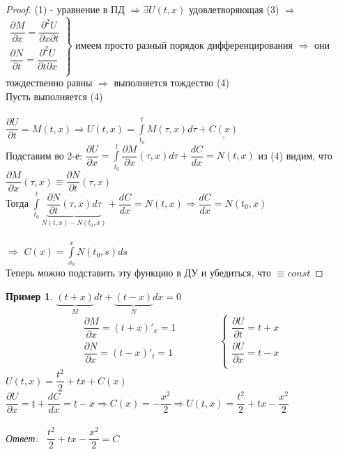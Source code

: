 \documentclass[12pt,a4paper,hidelinks]{article}            %
\newcommand{\pd}[2]{\dfrac{\partial #1}{\partial #2}}
\newcommand{\dd}[2]{\dfrac{d #1}{d #2}}
\newtheorem*{mex}{Пример}
\begin{document}
\begin{proof}
    (1) - уравнение в ПД $\Longrightarrow \exists U(t,x)$ удовлетворяющая (3) $\Longrightarrow$ \\
    $ \left.
    \begin{aligned}
    \pd{M}{x}=\dfrac{\partial^2U}{\partial x \partial t}\\
    \pd{N}{t}=\dfrac{\partial^2U}{\partial t \partial x}\\
    \end{aligned}
    \right\} $
    имеем просто разный порядок дифференцирования $\Longrightarrow$ они тождественно равны $\Longrightarrow$ выполняется тождество (4) \\
    \boxed{\Longleftarrow}
    Пусть выполняется (4) \\\\
    $\pd{U}{t}=M(t,x)\Longrightarrow U(t,x)=\int\limits^{t}_{t_0}M(\tau ,x)d\tau+\underline{\underline{C(x)}}$ \\
    Подставим во 2-е: $\pd{U}{x}=\int\limits^{t}_{t_0}\pd{M}{x}(\tau,x)d\tau+\dd{C}{x}=N(t,x)$ из (4) видим, что $\pd{M}{x}(\tau,x)\equiv\pd{N}{t}(\tau,x)$ \\
    Тогда $\int\limits^{t}_{t_0}\underbrace{\pd{N}{t}(\tau,x)d\tau}_{N(t,x)-N(t_0,x)}+\dd{C}{x}=N(t,x)\Longrightarrow\dd{C}{x}=N(t_0,x)$ \\\\
    $\Longrightarrow$ $C(x)=\int\limits^{x}_{x_0}N(t_0,s)ds$ \\
    Теперь можно подставить эту функцию в ДУ и убедиться, что $\equiv const$
\end{proof}
\begin{mex}
    $\underbrace{(t+x)}_Mdt+\underbrace{(t-x)}_Ndx=0$
    \begin{equation*}
    \begin{aligned}
        \pd{M}{x}=(t+x)'_x=1\\
        \pd{N}{x}=(t-x)'_t=1\\
    \end{aligned}
    \qquad\qquad
    \left\{
    \begin{aligned}
        \pd{U}{t}=t+x\\
        \pd{U}{x}=t-x\\
    \end{aligned}
    \right.
    \end{equation*}
    $U(t,x)=\dfrac{t^2}{2}+tx+C(x)$
    $\pd{U}{x}=\underline{t}+\dd{C}{x}=\underline{t}-x\Longrightarrow C(x)=-\dfrac{x^2}{2}\Longrightarrow U(t,x)=\dfrac{t^2}{2}+tx-\dfrac{x^2}{2}$ \\\\
    \mbox{Ответ: } $\dfrac{t^2}{2}+tx-\dfrac{x^2}{2}=C$
\end{mex}
\end{document}
